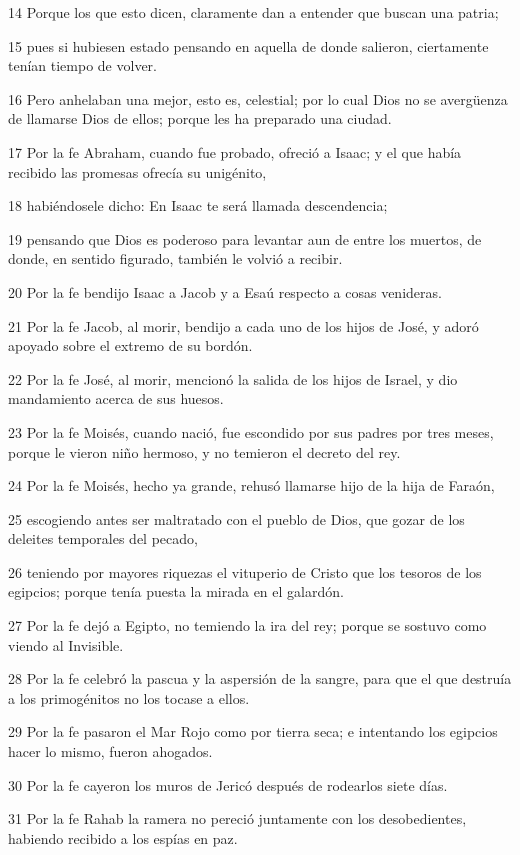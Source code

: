 \par 14 Porque los que esto dicen, claramente dan a entender que buscan una patria;
\par 15 pues si hubiesen estado pensando en aquella de donde salieron, ciertamente tenían tiempo de volver.
\par 16 Pero anhelaban una mejor, esto es, celestial; por lo cual Dios no se avergüenza de llamarse Dios de ellos; porque les ha preparado una ciudad.
\par 17 Por la fe Abraham, cuando fue probado, ofreció a Isaac; y el que había recibido las promesas ofrecía su unigénito,
\par 18 habiéndosele dicho: En Isaac te será llamada descendencia;
\par 19 pensando que Dios es poderoso para levantar aun de entre los muertos, de donde, en sentido figurado, también le volvió a recibir.
\par 20 Por la fe bendijo Isaac a Jacob y a Esaú respecto a cosas venideras.
\par 21 Por la fe Jacob, al morir, bendijo a cada uno de los hijos de José, y adoró apoyado sobre el extremo de su bordón.
\par 22 Por la fe José, al morir, mencionó la salida de los hijos de Israel, y dio mandamiento acerca de sus huesos.
\par 23 Por la fe Moisés, cuando nació, fue escondido por sus padres por tres meses, porque le vieron niño hermoso, y no temieron el decreto del rey.
\par 24 Por la fe Moisés, hecho ya grande, rehusó llamarse hijo de la hija de Faraón,
\par 25 escogiendo antes ser maltratado con el pueblo de Dios, que gozar de los deleites temporales del pecado,
\par 26 teniendo por mayores riquezas el vituperio de Cristo que los tesoros de los egipcios; porque tenía puesta la mirada en el galardón.
\par 27 Por la fe dejó a Egipto, no temiendo la ira del rey; porque se sostuvo como viendo al Invisible.
\par 28 Por la fe celebró la pascua y la aspersión de la sangre, para que el que destruía a los primogénitos no los tocase a ellos.
\par 29 Por la fe pasaron el Mar Rojo como por tierra seca; e intentando los egipcios hacer lo mismo, fueron ahogados.
\par 30 Por la fe cayeron los muros de Jericó después de rodearlos siete días.
\par 31 Por la fe Rahab la ramera no pereció juntamente con los desobedientes, habiendo recibido a los espías en paz.
